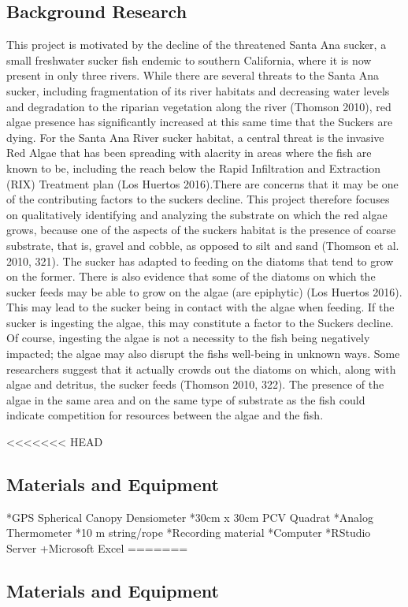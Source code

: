 \documentclass{article}
\begin{document}
\subsection{Background Research} 
This project is motivated by the decline of the threatened Santa Ana sucker, a small freshwater sucker ﬁsh endemic to southern California, where it is now present in only three rivers. While there are several threats to the Santa Ana sucker, including fragmentation of its river habitats and decreasing water levels and degradation to the riparian vegetation along the river (Thomson 2010), red algae presence has significantly increased at this same time that the Suckers are dying. For the Santa Ana River sucker habitat, a central threat is the invasive Red Algae that has been spreading with alacrity in areas where the ﬁsh are known to be, including the reach below the Rapid Inﬁltration and Extraction (RIX) Treatment plan (Los Huertos 2016).There are concerns that it may be one of the contributing factors to the suckers decline. This project therefore focuses on qualitatively identifying and analyzing the substrate on which the red algae grows, because one of the aspects of the suckers habitat is the presence of coarse substrate, that is, gravel and cobble, as opposed to silt and sand (Thomson et al. 2010, 321). The sucker has adapted to feeding on the diatoms that tend to grow on the former. There is also evidence that some of the diatoms on which the sucker feeds may be able to grow on the algae (are epiphytic) (Los Huertos 2016). This may lead to the sucker being in contact with the algae when feeding. If the sucker is ingesting the algae, this may constitute a factor to the Suckers decline. Of course, ingesting the algae is not a necessity to the ﬁsh being negatively impacted; the algae may also disrupt the ﬁshs well-being in unknown ways. Some researchers suggest that it actually crowds out the diatoms on which, along with algae and detritus, the sucker feeds (Thomson 2010, 322). The presence of the algae in the same area and on the same type of substrate as the ﬁsh could indicate competition for resources between the algae and the ﬁsh.


<<<<<<< HEAD
\subsection{Materials and Equipment} 
*GPS Spherical Canopy Densiometer 
*30cm x 30cm PCV Quadrat 
*Analog Thermometer 
*10 m string/rope
*Recording material
*Computer
*RStudio Server
+Microsoft Excel
=======
\subsection{Materials and Equipment}
\end{document}
